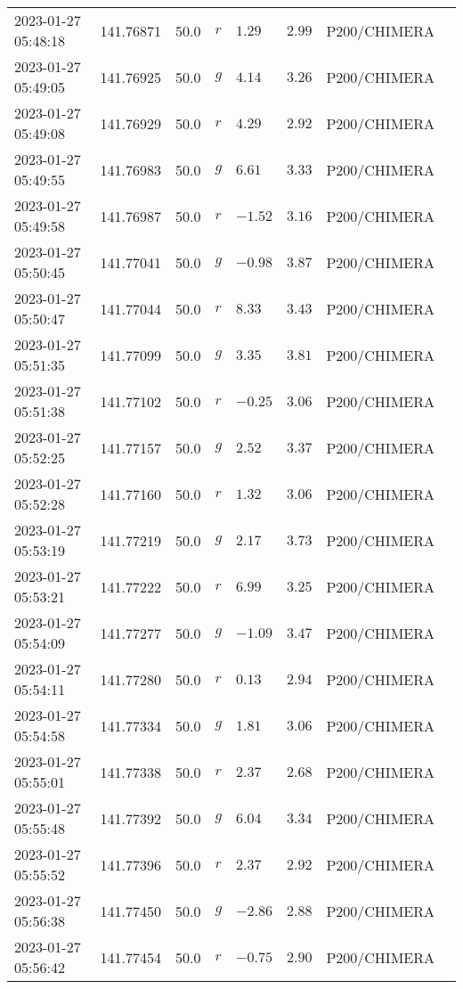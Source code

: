 \documentclass{nature_plusfigure}
\begin{document}
\begin{supplement}
\begin{center}
\begin{longtable}{llllllll}
2023-01-27 05:48:18 & 141.76871 & 50.0 & $r$ & $1.29$ & $2.99$ & P200/CHIMERA &  \\ 
2023-01-27 05:49:05 & 141.76925 & 50.0 & $g$ & $4.14$ & $3.26$ & P200/CHIMERA &  \\ 
2023-01-27 05:49:08 & 141.76929 & 50.0 & $r$ & $4.29$ & $2.92$ & P200/CHIMERA &  \\ 
2023-01-27 05:49:55 & 141.76983 & 50.0 & $g$ & $6.61$ & $3.33$ & P200/CHIMERA &  \\ 
2023-01-27 05:49:58 & 141.76987 & 50.0 & $r$ & $-1.52$ & $3.16$ & P200/CHIMERA &  \\ 
2023-01-27 05:50:45 & 141.77041 & 50.0 & $g$ & $-0.98$ & $3.87$ & P200/CHIMERA &  \\ 
2023-01-27 05:50:47 & 141.77044 & 50.0 & $r$ & $8.33$ & $3.43$ & P200/CHIMERA &  \\ 
2023-01-27 05:51:35 & 141.77099 & 50.0 & $g$ & $3.35$ & $3.81$ & P200/CHIMERA &  \\ 
2023-01-27 05:51:38 & 141.77102 & 50.0 & $r$ & $-0.25$ & $3.06$ & P200/CHIMERA &  \\ 
2023-01-27 05:52:25 & 141.77157 & 50.0 & $g$ & $2.52$ & $3.37$ & P200/CHIMERA &  \\ 
2023-01-27 05:52:28 & 141.77160 & 50.0 & $r$ & $1.32$ & $3.06$ & P200/CHIMERA &  \\ 
2023-01-27 05:53:19 & 141.77219 & 50.0 & $g$ & $2.17$ & $3.73$ & P200/CHIMERA &  \\ 
2023-01-27 05:53:21 & 141.77222 & 50.0 & $r$ & $6.99$ & $3.25$ & P200/CHIMERA &  \\ 
2023-01-27 05:54:09 & 141.77277 & 50.0 & $g$ & $-1.09$ & $3.47$ & P200/CHIMERA &  \\ 
2023-01-27 05:54:11 & 141.77280 & 50.0 & $r$ & $0.13$ & $2.94$ & P200/CHIMERA &  \\ 
2023-01-27 05:54:58 & 141.77334 & 50.0 & $g$ & $1.81$ & $3.06$ & P200/CHIMERA &  \\ 
2023-01-27 05:55:01 & 141.77338 & 50.0 & $r$ & $2.37$ & $2.68$ & P200/CHIMERA &  \\ 
2023-01-27 05:55:48 & 141.77392 & 50.0 & $g$ & $6.04$ & $3.34$ & P200/CHIMERA &  \\ 
2023-01-27 05:55:52 & 141.77396 & 50.0 & $r$ & $2.37$ & $2.92$ & P200/CHIMERA &  \\ 
2023-01-27 05:56:38 & 141.77450 & 50.0 & $g$ & $-2.86$ & $2.88$ & P200/CHIMERA &  \\ 
2023-01-27 05:56:42 & 141.77454 & 50.0 & $r$ & $-0.75$ & $2.90$ & P200/CHIMERA &  \\ 

\end{longtable}
\end{center}
\end{supplement}
\end{document}
